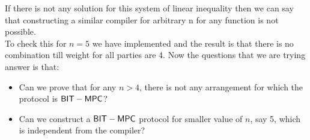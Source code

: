 If there is not any solution for this system of linear inequality then we can say that constructing a similar compiler for arbitrary n for any function is not possible.\\
To check this for $n=5$ we have implemented and the result is that there is no combination till weight for all parties are 4. 
Now the questions that we are trying answer is that:
\begin{itemize}
	\item Can we prove that for any $n>4$, there is not any arrangement for which the protocol is $\mathsf{BIT-MPC}$?
	\item Can we construct a $\mathsf{BIT-MPC}$ protocol for smaller value of $n$, say 5, which is independent from the compiler?
\end{itemize}
